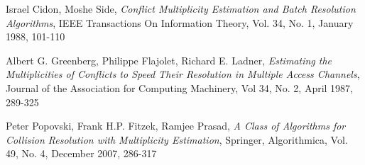\begin{thebibliography}{99}
 
 Israel Cidon, Moshe Side, \emph{Conflict Multiplicity Estimation and Batch Resolution Algorithms}, IEEE Transactions On Information Theory, Vol. 34, No. 1, January 1988, 101-110
 
  Albert G. Greenberg, Philippe Flajolet,  Richard E. Ladner,
  \emph{Estimating the Multiplicities of Conflicts to Speed Their Resolution in Multiple Access Channels},
  Journal of the Association for Computing Machinery,
  Vol 34, No. 2, April 1987, 289-325
  
  Peter Popovski, Frank H.P. Fitzek, Ramjee Prasad, \emph{ A Class of Algorithms for Collision Resolution with Multiplicity Estimation}, Springer, Algorithmica, Vol. 49, No. 4, December 2007, 286-317
 
 \end{thebibliography}